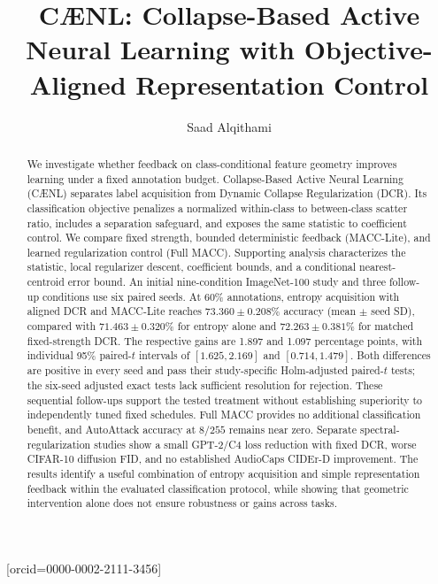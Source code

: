 \documentclass[a4paper,fleqn]{cas-dc}
\begin{document}
\title[mode=title]{C\AE{}NL: Collapse-Based Active Neural Learning
with Objective-Aligned Representation Control}
\author{Saad Alqithami}[orcid=0000-0002-2111-3456]
\cormark[1]

\begin{abstract}
We investigate whether feedback on class-conditional feature geometry
improves learning under a fixed annotation budget. Collapse-Based Active
Neural Learning (C\AE{}NL) separates label acquisition from Dynamic Collapse
Regularization (DCR). Its classification objective penalizes a normalized
within-class to between-class scatter ratio, includes a separation
safeguard, and exposes the same statistic to coefficient control.
We compare fixed strength, bounded deterministic feedback (MACC-Lite),
and learned regularization control (Full MACC). Supporting analysis
characterizes the statistic, local regularizer descent, coefficient
bounds, and a conditional nearest-centroid error bound.
An initial nine-condition ImageNet-100 study and three follow-up conditions
use six paired seeds. At 60\% annotations, entropy acquisition with aligned
DCR and MACC-Lite reaches $73.360\pm0.208\%$ accuracy (mean $\pm$ seed SD),
compared with $71.463\pm0.320\%$ for entropy alone and
$72.263\pm0.381\%$ for matched fixed-strength DCR. The respective gains are
1.897 and 1.097 percentage points, with individual 95\% paired-$t$ intervals
of $[1.625,2.169]$ and $[0.714,1.479]$. Both differences are positive in every
seed and pass their study-specific Holm-adjusted paired-$t$ tests;
the six-seed adjusted exact tests lack sufficient resolution for rejection.
These sequential follow-ups support the tested treatment without
establishing superiority to independently tuned fixed schedules.
Full MACC provides no additional classification benefit, and AutoAttack
accuracy at $8/255$ remains near zero. Separate spectral-regularization
studies show a small GPT-2/C4 loss reduction with fixed DCR, worse CIFAR-10
diffusion FID, and no established AudioCaps CIDEr-D improvement.
The results identify a useful combination of entropy acquisition and
simple representation feedback within the evaluated classification
protocol, while showing that geometric intervention alone does not ensure
robustness or gains across tasks.

\end{abstract}
\end{document}
